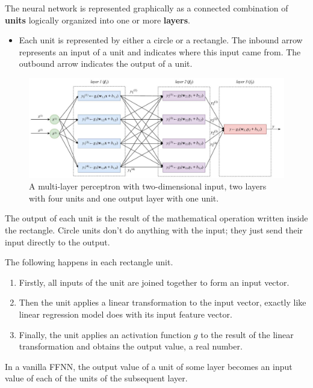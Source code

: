 \documentclass[8pt,dvipsnames]{beamer}
\begin{document}
\begin{frame}
	The neural network is represented graphically as a connected combination of \textbf{units} logically organized into one or more \textbf{layers}.
	\begin{itemize}
		\item Each unit is represented by either a circle or a rectangle. The inbound arrow represents an input of a unit and indicates where this input came from. The outbound arrow indicates the output of a unit.
	\end{itemize}
	\begin{figure}
		\centering
		\includegraphics[width=\textwidth]{imgs/nn_1.jpeg}
		\caption{A multi-layer perceptron with two-dimensional input, two layers with four units and one output layer with one unit.}
	\end{figure}
\end{frame}

\begin{frame}
	The output of each unit is the result of the mathematical operation written inside the rectangle. Circle units don't do anything with the input; they just send their input directly to the output.

	The following happens in each rectangle unit.
	\begin{enumerate}
		\item Firstly, all inputs of the unit are joined together to form an input vector.
		\item Then the unit applies a linear transformation to the input vector, exactly like linear regression model does with its input feature vector.
		\item Finally, the unit applies an activation function $g$ to the result of the linear transformation and obtains the output value, a real number.
	\end{enumerate}
	In a vanilla FFNN, the output value of a unit of some layer becomes an input value of each of the units of the subsequent layer.
\end{frame}
\end{document}

